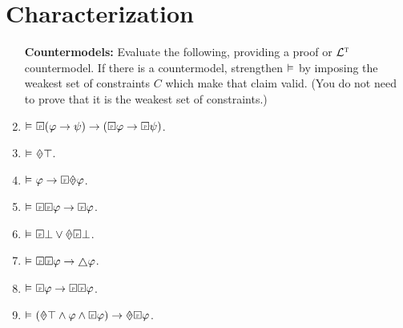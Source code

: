 \documentclass[a4paper, 11pt]{article}                  %
\begin{document}
\section{Characterization}

\begin{enumerate}
	\item[\bf Countermodels:] Evaluate the following, providing a proof or $\TL$ countermodel.
    If there is a countermodel, strengthen $\MLmodels[]$ by imposing the weakest set of constraints $C$ which make that claim valid. 
    (You do not need to prove that it is the weakest set of constraints.)

    \item $\MLmodels[] \Past(\metaA \rightarrow \metaB) \rightarrow (\Past\metaA \rightarrow \Past\metaB)$.

    \item $\MLmodels[] \past\top$.

    \item $\MLmodels[] \metaA \rightarrow \Future \past \metaA$.

    \item $\MLmodels[] \Past\Past\metaA \rightarrow \Past\metaA$.

    \item $\MLmodels[] \Past\bot \vee \past\Past\bot$.

    \item $\MLmodels[] \Past\Future\metaA \rightarrow \always\metaA$.

    \item $\MLmodels[] \Past\metaA \rightarrow \Past\Past\metaA$.

    \item $\MLmodels[] (\past\top \wedge \metaA \wedge \Future\metaA) \rightarrow \past\Future\metaA$.



\end{enumerate}
\end{document}
